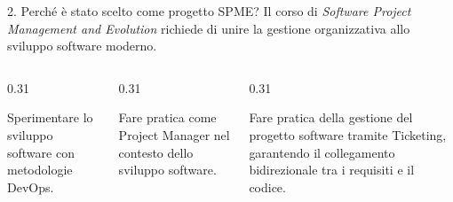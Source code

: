 \documentclass[aspectratio=169, 10pt]{beamer}
\begin{document}
\begin{frame}{2. Perché è stato scelto come progetto SPME?}
  Il corso di \emph{Software Project Management and Evolution} richiede di unire la gestione organizzativa allo sviluppo software moderno.
  \vspace{0.4cm}
  \begin{columns}
    \begin{column}{0.31\textwidth}
      \begin{tcolorbox}[colback=karateDark!5, colframe=karateDark, title=1. Metodologie DevOps, height=4.5cm]
        Sperimentare lo sviluppo software con metodologie DevOps.
      \end{tcolorbox}
    \end{column}
    \begin{column}{0.31\textwidth}
      \begin{tcolorbox}[colback=karateDark!5, colframe=karateDark, title=2. Project Management, height=4.5cm]
        Fare pratica come Project Manager nel contesto dello sviluppo software.
      \end{tcolorbox}
    \end{column}
    \begin{column}{0.31\textwidth}
      \begin{tcolorbox}[colback=karateDark!5, colframe=karateDark, title=3. Traceability, height=4.5cm]
        Fare pratica della gestione del progetto software tramite Ticketing, garantendo il collegamento bidirezionale tra i requisiti e il codice. 
      \end{tcolorbox}
    \end{column}
  \end{columns}
\end{frame}
\end{document}
